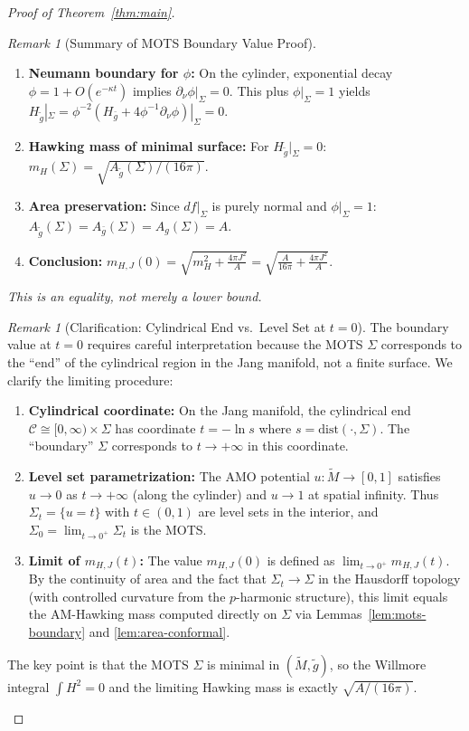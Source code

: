 \documentclass[12pt]{article}
\theoremstyle{plain}
\theoremstyle{definition}
\theoremstyle{remark}
\newtheorem{remark}[theorem]{Remark}
\newcommand{\tM}{\tilde{M}}
\newcommand{\tg}{\tilde{g}}
\newcommand{\bg}{\bar{g}}
\begin{document}
\begin{proof}[Proof of Theorem~\ref{thm:main}]
\begin{remark}[Summary of MOTS Boundary Value Proof]
\begin{enumerate}[label=\textup{(\arabic*)}, leftmargin=2em, itemsep=1pt]
    \item \textbf{Neumann boundary for $\phi$:} On the cylinder, exponential decay $\phi = 1 + O(e^{-\kappa t})$ implies $\partial_\nu\phi|_\Sigma = 0$. This plus $\phi|_\Sigma = 1$ yields $H_{\tg}|_\Sigma = \phi^{-2}(H_{\bg} + 4\phi^{-1}\partial_\nu\phi)|_\Sigma = 0$.
    
    \item \textbf{Hawking mass of minimal surface:} For $H_{\tg}|_\Sigma = 0$: $m_H(\Sigma) = \sqrt{A_{\tg}(\Sigma)/(16\pi)}$.
    
    \item \textbf{Area preservation:} Since $df|_\Sigma$ is purely normal and $\phi|_\Sigma = 1$: $A_{\tg}(\Sigma) = A_{\bg}(\Sigma) = A_g(\Sigma) = A$.
    
    \item \textbf{Conclusion:} $\displaystyle m_{H,J}(0) = \sqrt{m_H^2 + \frac{4\pi J^2}{A}} = \sqrt{\frac{A}{16\pi} + \frac{4\pi J^2}{A}}$.
\end{enumerate}
\vspace{-0.5em}
\textit{This is an equality, not merely a lower bound.}
\end{remark}
\vspace{0.3cm}

\begin{remark}[Clarification: Cylindrical End vs.\ Level Set at $t = 0$]\label{rem:t0-clarification}
The boundary value at $t = 0$ requires careful interpretation because the MOTS $\Sigma$ corresponds to the ``end'' of the cylindrical region in the Jang manifold, not a finite surface. We clarify the limiting procedure:
\begin{enumerate}
    \item \textbf{Cylindrical coordinate:} On the Jang manifold, the cylindrical end $\mathcal{C} \cong [0, \infty) \times \Sigma$ has coordinate $t = -\ln s$ where $s = \mathrm{dist}(\cdot, \Sigma)$. The ``boundary'' $\Sigma$ corresponds to $t \to +\infty$ in this coordinate.
    \item \textbf{Level set parametrization:} The AMO potential $u: \tM \to [0, 1]$ satisfies $u \to 0$ as $t \to +\infty$ (along the cylinder) and $u \to 1$ at spatial infinity. Thus $\Sigma_t = \{u = t\}$ with $t \in (0, 1)$ are level sets in the interior, and $\Sigma_0 = \lim_{t \to 0^+} \Sigma_t$ is the MOTS.
    \item \textbf{Limit of $m_{H,J}(t)$:} The value $m_{H,J}(0)$ is defined as $\lim_{t \to 0^+} m_{H,J}(t)$. By the continuity of area and the fact that $\Sigma_t \to \Sigma$ in the Hausdorff topology (with controlled curvature from the $p$-harmonic structure), this limit equals the AM-Hawking mass computed directly on $\Sigma$ via Lemmas~\ref{lem:mots-boundary} and \ref{lem:area-conformal}.
\end{enumerate}
The key point is that the MOTS $\Sigma$ is minimal in $(\tM, \tg)$, so the Willmore integral $\int H^2 = 0$ and the limiting Hawking mass is exactly $\sqrt{A/(16\pi)}$.
\end{remark}


\end{proof}
\end{document}
